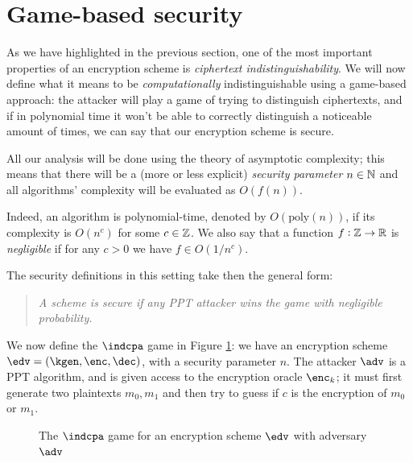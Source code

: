 \section{Game-based security}
As we have highlighted in the previous section, one of the most important properties of an encryption scheme is \emph{ciphertext indistinguishability}. We will now define what it means to be \emph{computationally} indistinguishable using a game-based approach: the attacker will play a game of trying to distinguish ciphertexts, and if in polynomial time it won't be able to correctly distinguish a noticeable amount of times, we can say that our encryption scheme is secure.

All our analysis will be done using the theory of asymptotic complexity; this means that there will be a (more or less explicit) \emph{security parameter} $n\in\mathbb{N}$ and all algorithms' complexity will be evaluated as $O(f(n))$.

Indeed, an algorithm is polynomial-time, denoted by $O(\text{poly}(n))$, if its complexity is $O(n^c)$ for some $c\in\mathbb{Z}$. We also say that a function $f:\mathbb{Z}\to\mathbb{R}$ is \emph{negligible} if for any $c>0$ we have $f\in O(1/n^c)$.

The security definitions in this setting take then the general form:

\begin{quote}
    \textit{A scheme is \emph{secure} if any PPT attacker wins the game with negligible probability.}
\end{quote}
We now define the $\indcpa$ game in Figure \ref{game_indcpa}: we have an encryption scheme $\edv=(\kgen,\enc,\dec)$, with a security parameter $n$. The attacker $\adv$ is a PPT algorithm, and is given access to the encryption oracle $\enc_k$; it must first generate two plaintexts $m_0,m_1$ and then try to guess if $c$ is the encryption of $m_0$ or $m_1$.

\begin{figure}
    \caption{The $\indcpa$ game for an encryption scheme $\edv$ with adversary $\adv$}
    \label{game_indcpa}
\end{figure}

